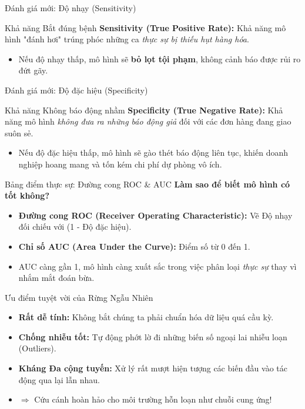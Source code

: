 \documentclass[aspectratio=169]{beamer}
\begin{document}
\begin{frame}{Đánh giá mới: Độ nhạy (Sensitivity)}
    \begin{block}{Khả năng Bắt đúng bệnh}
        \textbf{Sensitivity (True Positive Rate):} Khả năng mô hình "đánh hơi" trúng phóc những ca \textit{thực sự bị thiếu hụt hàng hóa}.
        \begin{itemize}
            \item Nếu độ nhạy thấp, mô hình sẽ \textbf{bỏ lọt tội phạm}, không cảnh báo được rủi ro đứt gãy.
        \end{itemize}
    \end{block}
\end{frame}

\begin{frame}{Đánh giá mới: Độ đặc hiệu (Specificity)}
    \begin{block}{Khả năng Không báo động nhầm}
        \textbf{Specificity (True Negative Rate):} Khả năng mô hình \textit{không đưa ra những báo động giả} đối với các đơn hàng đang giao suôn sẻ.
        \begin{itemize}
            \item Nếu độ đặc hiệu thấp, mô hình sẽ gào thét báo động liên tục, khiến doanh nghiệp hoang mang và tốn kém chi phí dự phòng vô ích.
        \end{itemize}
    \end{block}
\end{frame}

\begin{frame}{Bảng điểm thực sự: Đường cong ROC \& AUC}
    \textbf{Làm sao để biết mô hình có tốt không?}
    \begin{itemize}
        \item \textbf{Đường cong ROC (Receiver Operating Characteristic):} Vẽ Độ nhạy đối chiếu với (1 - Độ đặc hiệu).
        \item \textbf{Chỉ số AUC (Area Under the Curve):} Điểm số từ 0 đến 1.
        \item AUC càng gần 1, mô hình càng xuất sắc trong việc phân loại \textit{thực sự} thay vì nhắm mắt đoán bừa.
    \end{itemize}
\end{frame}

\begin{frame}{Ưu điểm tuyệt vời của Rừng Ngẫu Nhiên}
    \begin{itemize}
        \item \textbf{Rất dễ tính:} Không bắt chúng ta phải chuẩn hóa dữ liệu quá cầu kỳ.
        \item \textbf{Chống nhiễu tốt:} Tự động phớt lờ đi những biến số ngoại lai nhiễu loạn (Outliers).
        \item \textbf{Kháng Đa cộng tuyến:} Xử lý rất mượt hiện tượng các biến đầu vào tác động qua lại lẫn nhau.
        \item $\Rightarrow$ Cứu cánh hoàn hảo cho môi trường hỗn loạn như chuỗi cung ứng!
    \end{itemize}
\end{frame}
\end{document}
